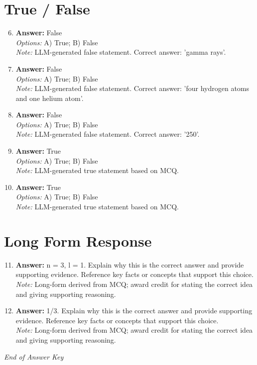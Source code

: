 \documentclass[12pt]{article}
\begin{document}
\section*{True / False}
\begin{enumerate}[label=\arabic*.]
\setcounter{enumi}{5}
\item \textbf{Answer:} False
\\ \textit{Options:} A) True; B) False
\\ \textit{Note:} LLM-generated false statement. Correct answer: 'gamma rays'.
\item \textbf{Answer:} False
\\ \textit{Options:} A) True; B) False
\\ \textit{Note:} LLM-generated false statement. Correct answer: 'four hydrogen atoms and one helium atom'.
\item \textbf{Answer:} False
\\ \textit{Options:} A) True; B) False
\\ \textit{Note:} LLM-generated false statement. Correct answer: '250'.
\item \textbf{Answer:} True
\\ \textit{Options:} A) True; B) False
\\ \textit{Note:} LLM-generated true statement based on MCQ.
\item \textbf{Answer:} True
\\ \textit{Options:} A) True; B) False
\\ \textit{Note:} LLM-generated true statement based on MCQ.
\end{enumerate}

\section*{Long Form Response}
\begin{enumerate}[label=\arabic*.]
\setcounter{enumi}{10}
\item \textbf{Answer:} n = 3, l = 1. Explain why this is the correct answer and provide supporting evidence. Reference key facts or concepts that support this choice.
\\ \textit{Note:} Long-form derived from MCQ; award credit for stating the correct idea and giving supporting reasoning.
\item \textbf{Answer:} 1/3. Explain why this is the correct answer and provide supporting evidence. Reference key facts or concepts that support this choice.
\\ \textit{Note:} Long-form derived from MCQ; award credit for stating the correct idea and giving supporting reasoning.
\end{enumerate}

\vfill
\noindent\textit{End of Answer Key}
\end{document}
